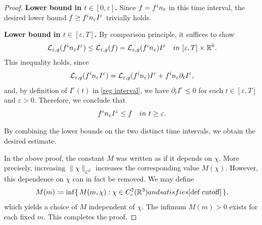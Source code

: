 \documentclass[10pt,a4paper]{amsart}
\begin{document}
\begin{proof}
\textbf{Lower bound in $t\in[0,\varepsilon]$.} Since $f=f^\textup{in}_\varepsilon$ in this time interval, the desired lower bound $f\ge f^\textup{in}_\varepsilon I^\varepsilon$ trivially holds.

\textbf{Lower bound in $t\in[\varepsilon, T]$.} By comparison principle, it suffices to show 
\begin{align*}
\mathcal{L}_{\varepsilon,g}(f^\textup{in}_\varepsilon I^\varepsilon) \le \mathcal{L}_{\varepsilon,g}(f)=\mathcal{L}_{\varepsilon,g}(f^\textup{in}_\varepsilon)I^\varepsilon \quad \textup{ in }\,\, [\varepsilon, T]\times\mathbb{R}^6.
\end{align*}This inequality holds, since $$\mathcal{L}_{\varepsilon,g}(f^\textup{in}_\varepsilon I^\varepsilon) =\mathcal{L}_{\varepsilon,g}(f^\textup{in}_\varepsilon)I^\varepsilon+ f^\textup{in}_\varepsilon\partial_t I^\varepsilon, $$ and, by definition of $I^\varepsilon(t)$ in \eqref{reg interval}, we have $\partial_tI^\varepsilon \le0$ for each $t\in[\varepsilon,T]$ and  $\varepsilon>0$. Therefore, we conclude that
\begin{align*}
f^\textup{in}_\varepsilon I^\varepsilon \le f \quad \textup{in}\,\, t\ge\varepsilon.
\end{align*}

By combining the lower bounds on the two distinct time intervals, we obtain the desired estimate.

In the above proof, the constant $M$ was written as if it depends on $\chi$. More precisely, increasing $\|\chi\|_{C^{2}}$ increases the corresponding value $M(\chi)$. However, this dependence on $\chi$ can in fact be removed. We may define
$$
    M(m) \coloneqq \inf\{\, M(m,\chi) : \chi\in C_c^2(\mathbb{R}^3) \textup{ and satisfies }\eqref{def cutoff}\,\},
$$
which yields a choice of $M$ independent of $\chi$. The infimum $M(m)>0$ exists for each fixed $m$. This completes the proof.
\end{proof}
\end{document}
